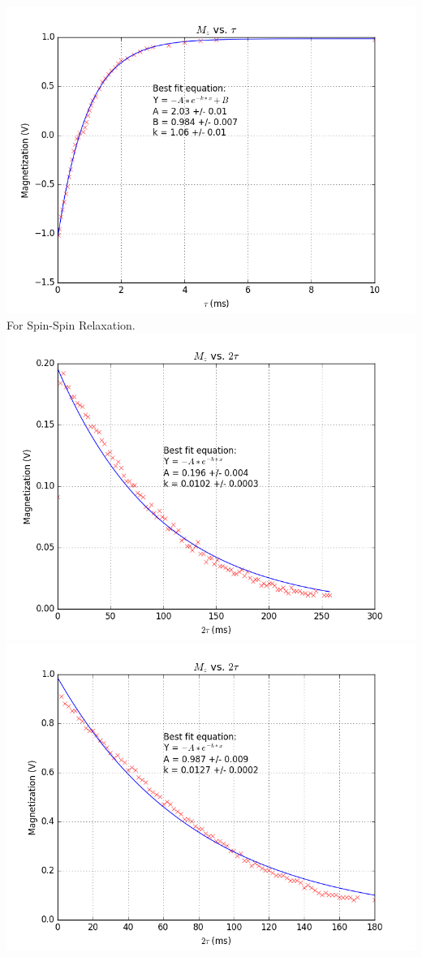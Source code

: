 \documentclass{article}
\begin{document}
{\begin{multicols}{2}
\label{fig:25}
\includegraphics[width=\linewidth]{pic-for-report/1.000M-CuSO4-T1-inset.png}
\label{fig:26}
\justify
For Spin-Spin Relaxation.
\includegraphics[width=\linewidth]{pic-for-report/0.005M-CuSO4-T2-MG.png}
\label{fig:27}
\includegraphics[width=\linewidth]{pic-for-report/0.010M-CuSO4-T2-MG.png}

\end{multicols}}
\end{document}

